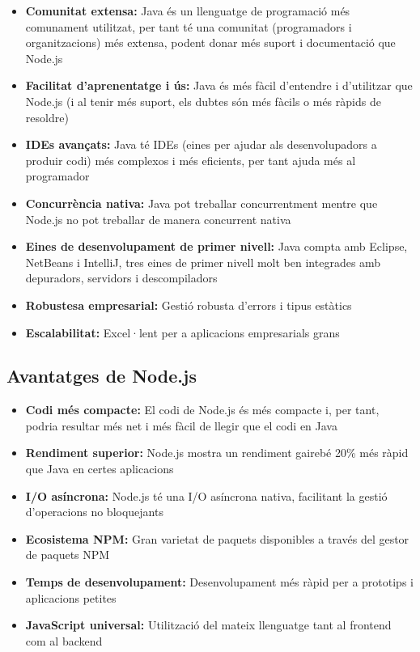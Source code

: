 \documentclass[12pt,a4paper]{article}
\begin{document}
\begin{itemize}
    \item \textbf{Comunitat extensa:} Java és un llenguatge de programació més comunament utilitzat, per tant té una comunitat (programadors i organitzacions) més extensa, podent donar més suport i documentació que Node.js
    \item \textbf{Facilitat d'aprenentatge i ús:} Java és més fàcil d'entendre i d'utilitzar que Node.js (i al tenir més suport, els dubtes són més fàcils o més ràpids de resoldre)
    \item \textbf{IDEs avançats:} Java té IDEs (eines per ajudar als desenvolupadors a produir codi) més complexos i més eficients, per tant ajuda més al programador
    \item \textbf{Concurrència nativa:} Java pot treballar concurrentment mentre que Node.js no pot treballar de manera concurrent nativa
    \item \textbf{Eines de desenvolupament de primer nivell:} Java compta amb Eclipse, NetBeans i IntelliJ, tres eines de primer nivell molt ben integrades amb depuradors, servidors i descompiladors
    \item \textbf{Robustesa empresarial:} Gestió robusta d'errors i tipus estàtics
    \item \textbf{Escalabilitat:} Excel·lent per a aplicacions empresarials grans
\end{itemize}

\subsection{Avantatges de Node.js}

\begin{itemize}
    \item \textbf{Codi més compacte:} El codi de Node.js és més compacte i, per tant, podria resultar més net i més fàcil de llegir que el codi en Java
    \item \textbf{Rendiment superior:} Node.js mostra un rendiment gairebé 20\% més ràpid que Java en certes aplicacions
    \item \textbf{I/O asíncrona:} Node.js té una I/O asíncrona nativa, facilitant la gestió d'operacions no bloquejants
    \item \textbf{Ecosistema NPM:} Gran varietat de paquets disponibles a través del gestor de paquets NPM
    \item \textbf{Temps de desenvolupament:} Desenvolupament més ràpid per a prototips i aplicacions petites
    \item \textbf{JavaScript universal:} Utilització del mateix llenguatge tant al frontend com al backend
\end{itemize}
\end{document}
